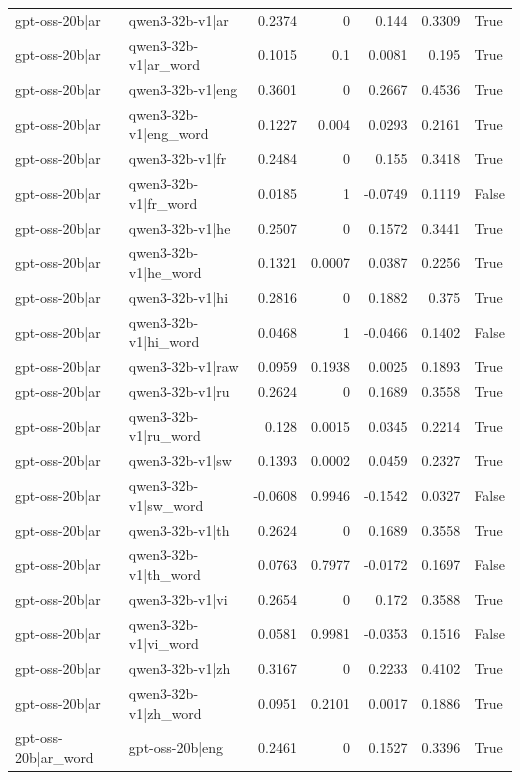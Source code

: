 \begin{table}
\begin{tabular}{l l r r r r l}
gpt-oss-20b|ar & qwen3-32b-v1|ar & 0.2374 & 0 & 0.144 & 0.3309 & True \\
gpt-oss-20b|ar & qwen3-32b-v1|ar_word & 0.1015 & 0.1 & 0.0081 & 0.195 & True \\
gpt-oss-20b|ar & qwen3-32b-v1|eng & 0.3601 & 0 & 0.2667 & 0.4536 & True \\
gpt-oss-20b|ar & qwen3-32b-v1|eng_word & 0.1227 & 0.004 & 0.0293 & 0.2161 & True \\
gpt-oss-20b|ar & qwen3-32b-v1|fr & 0.2484 & 0 & 0.155 & 0.3418 & True \\
gpt-oss-20b|ar & qwen3-32b-v1|fr_word & 0.0185 & 1 & -0.0749 & 0.1119 & False \\
gpt-oss-20b|ar & qwen3-32b-v1|he & 0.2507 & 0 & 0.1572 & 0.3441 & True \\
gpt-oss-20b|ar & qwen3-32b-v1|he_word & 0.1321 & 0.0007 & 0.0387 & 0.2256 & True \\
gpt-oss-20b|ar & qwen3-32b-v1|hi & 0.2816 & 0 & 0.1882 & 0.375 & True \\
gpt-oss-20b|ar & qwen3-32b-v1|hi_word & 0.0468 & 1 & -0.0466 & 0.1402 & False \\
gpt-oss-20b|ar & qwen3-32b-v1|raw & 0.0959 & 0.1938 & 0.0025 & 0.1893 & True \\
gpt-oss-20b|ar & qwen3-32b-v1|ru & 0.2624 & 0 & 0.1689 & 0.3558 & True \\
gpt-oss-20b|ar & qwen3-32b-v1|ru_word & 0.128 & 0.0015 & 0.0345 & 0.2214 & True \\
gpt-oss-20b|ar & qwen3-32b-v1|sw & 0.1393 & 0.0002 & 0.0459 & 0.2327 & True \\
gpt-oss-20b|ar & qwen3-32b-v1|sw_word & -0.0608 & 0.9946 & -0.1542 & 0.0327 & False \\
gpt-oss-20b|ar & qwen3-32b-v1|th & 0.2624 & 0 & 0.1689 & 0.3558 & True \\
gpt-oss-20b|ar & qwen3-32b-v1|th_word & 0.0763 & 0.7977 & -0.0172 & 0.1697 & False \\
gpt-oss-20b|ar & qwen3-32b-v1|vi & 0.2654 & 0 & 0.172 & 0.3588 & True \\
gpt-oss-20b|ar & qwen3-32b-v1|vi_word & 0.0581 & 0.9981 & -0.0353 & 0.1516 & False \\
gpt-oss-20b|ar & qwen3-32b-v1|zh & 0.3167 & 0 & 0.2233 & 0.4102 & True \\
gpt-oss-20b|ar & qwen3-32b-v1|zh_word & 0.0951 & 0.2101 & 0.0017 & 0.1886 & True \\
gpt-oss-20b|ar_word & gpt-oss-20b|eng & 0.2461 & 0 & 0.1527 & 0.3396 & True \\

\end{tabular}
\end{table}
